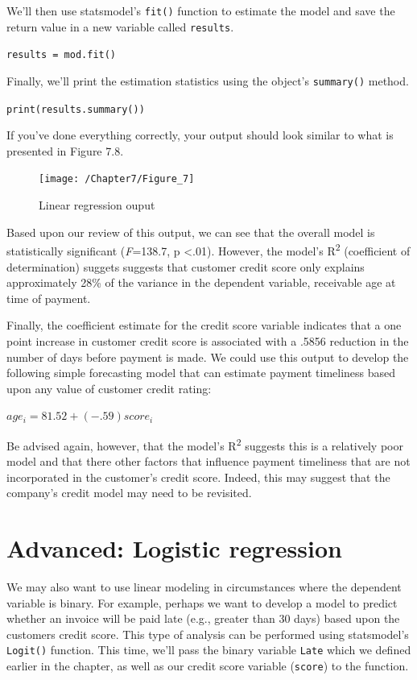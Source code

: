 \documentclass{book}
\begin{document}
We'll then use statsmodel's \texttt{fit()} function to estimate the model and save the return value in a new variable called \texttt{results}.

\texttt{results = mod.fit()}

Finally, we'll print the estimation statistics using the object's \texttt{summary()} method.

\texttt{print(results.summary())}

If you've done everything correctly, your output should look similar to what is presented in Figure 7.8.

\begin{figure}[h]
	\caption{Linear regression ouput}
	\centering\texttt{[image: /Chapter7/Figure\_7]}
\end{figure}

Based upon our review of this output, we can see that the overall model is statistically significant (\textit{F}=138.7, p \textless .01). However, the model's R\textsuperscript{2} (coefficient of determination) suggets suggests that customer credit score only explains approximately 28\% of the variance in the dependent variable, receivable age at time of payment.

Finally, the coefficient estimate for the credit score variable indicates that a one point increase in customer credit score is associated with a .5856 reduction in the number of days before payment is made. We could use this output to develop the following simple forecasting model that can estimate payment timeliness based upon any value of customer credit rating:

\begin{center}
	\begin{math}
	age_i = 81.52 + (-.59)score_i
	\end{math}
\end{center}

Be advised again, however, that the model's R\textsuperscript{2} suggests this is a relatively poor model and that there other factors that influence payment timeliness that are not incorporated in the customer's credit score. Indeed, this may suggest that the company's credit model may need to be revisited.

\section{Advanced: Logistic regression}

We may also want to use linear modeling in circumstances where the dependent variable is binary. For example, perhaps we want to develop a model to predict whether an invoice will be paid late (e.g., greater than 30 days) based upon the customers credit score. This type of analysis can be performed using statsmodel's \texttt{Logit()} function. This time, we'll pass the binary variable \texttt{Late} which we defined earlier in the chapter, as well as our credit score variable (\texttt{score}) to the function. 
\end{document}
